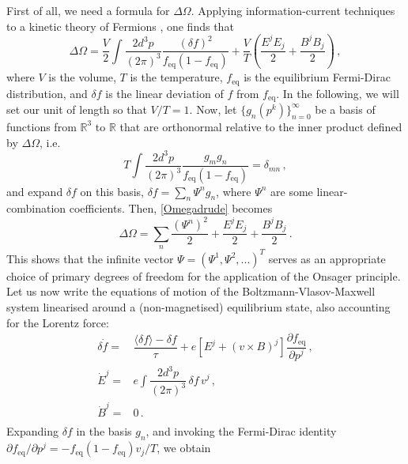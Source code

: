 \documentclass[a4paper, amsfonts, amssymb, amsmath, reprint, showkeys, nofootinbib, twoside,notitlepage,onecolumn]{revtex4-1}
\theoremstyle{definition}
\theoremstyle{theorem}
\begin{document}
First of all, we need a formula for $\Delta\Omega$. Applying information-current techniques to a kinetic theory of Fermions \cite{GavassinoGibbs2021,GavassinoCausality2021,SoaresRochaGavassinoKIneticFluctu2024afv}, one finds that
\begin{equation}\label{Omegadrude}
\Delta\Omega = \dfrac{V}{2}\int \dfrac{2d^3 p}{(2\pi)^3} \dfrac{(\delta f)^2}{f_{\text{eq}}(1-f_\text{eq})} +\dfrac{V}{T} \left(\dfrac{E^j E_j}{2}+\dfrac{B^j B_j}{2} \right)\, ,
\end{equation}
where $V$ is the volume, $T$ is the temperature, $f_{\text{eq}}$ is the equilibrium Fermi-Dirac distribution, and $\delta f$ is the linear deviation of $f$ from $f_{\text{eq}}$. In the following, we will set our unit of length so that $V/T=1$. Now, let $\{g_n(p^k)\}_{n=0}^{\infty}$ be a basis of functions from $\mathbb{R}^3$ to $\mathbb{R}$ that are orthonormal relative to the inner product defined by $\Delta \Omega$, i.e.
\begin{equation}
T \int \dfrac{2d^3 p}{(2\pi)^3} \dfrac{g_m g_n}{f_{\text{eq}}(1-f_\text{eq})} =\delta_{mn} \, ,
\end{equation}
and expand $\delta f$ on this basis, $\delta f=\sum_n \Psi^n g_n$, where $\Psi^n$ are some linear-combination coefficients. Then, \eqref{Omegadrude} becomes
\begin{equation}
\Delta\Omega =\sum_{n} \dfrac{(\Psi^n)^2}{2}  + \dfrac{E^j E_j}{2}+\dfrac{B^j B_j}{2} \, .
\end{equation}
This shows that the infinite vector $\Psi=(\Psi^1,\Psi^2,...)^T$ serves as an appropriate choice of primary degrees of freedom for the application of the Onsager principle. Let us now write the equations of motion of the Boltzmann-Vlasov-Maxwell system linearised around a (non-magnetised) equilibrium state, also accounting for the Lorentz force:
\begin{equation}
\begin{split}
\delta \Dot{f}={}& \dfrac{\langle \delta f\rangle -\delta f}{\tau} +e[E^j+(v{\times} B)^j] \dfrac{\partial f_{\text{eq}}}{\partial p^j}\, , \\ 
\Dot{E}^j ={}& e \int \dfrac{2d^3 p}{(2\pi)^3} \,  \delta f \, v^j \, ,\\
\Dot{B}^j ={}& 0 \, .\\
\end{split}
\end{equation}
Expanding $\delta f$ in the basis $g_n$, and invoking the Fermi-Dirac identity $\partial f_{\text{eq}}/\partial p^j=-f_{\text{eq}}(1-f_\text{eq}) v_j/T$, we obtain
\end{document}
